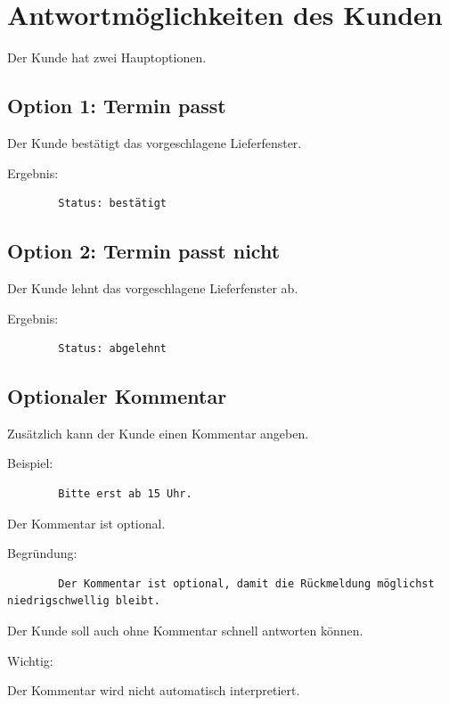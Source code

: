 \documentclass[12pt,a4paper]{article}
\begin{document}
	\section{Antwortmöglichkeiten des Kunden}
	
	Der Kunde hat zwei Hauptoptionen.
	
	\subsection{Option 1: Termin passt}
	
	Der Kunde bestätigt das vorgeschlagene Lieferfenster.
	
	Ergebnis:
	
	\begin{lstlisting}
		Status: bestätigt
	\end{lstlisting}
	
	\subsection{Option 2: Termin passt nicht}
	
	Der Kunde lehnt das vorgeschlagene Lieferfenster ab.
	
	Ergebnis:
	
	\begin{lstlisting}
		Status: abgelehnt
	\end{lstlisting}
	
	\subsection{Optionaler Kommentar}
	
	Zusätzlich kann der Kunde einen Kommentar angeben.
	
	Beispiel:
	
	\begin{lstlisting}
		Bitte erst ab 15 Uhr.
	\end{lstlisting}
	
	Der Kommentar ist optional.
	
	Begründung:
	
	\begin{lstlisting}
		Der Kommentar ist optional, damit die Rückmeldung möglichst niedrigschwellig bleibt.
	\end{lstlisting}
	
	Der Kunde soll auch ohne Kommentar schnell antworten können.
	
	Wichtig:
	
	Der Kommentar wird nicht automatisch interpretiert.
	
\end{document}
